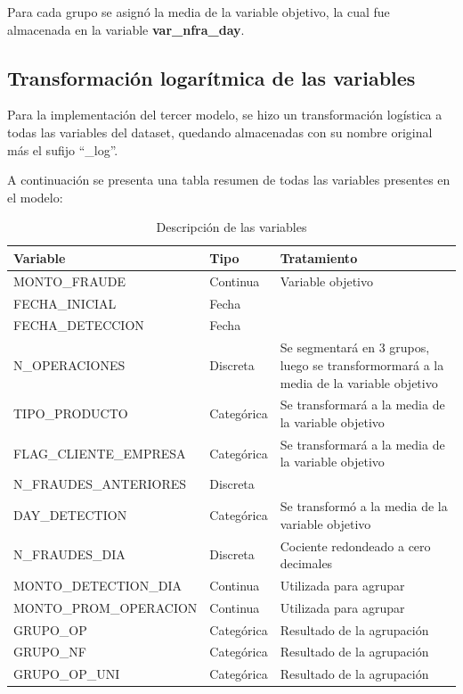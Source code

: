 \documentclass[
	11pt, %
	spanish, %
]{fphw}
\begin{document}
Para cada grupo se asignó la media de la variable objetivo, la cual fue almacenada en la variable \textbf{var\_nfra\_day}.

\subsection*{Transformación logarítmica de las variables}
Para la implementación del tercer modelo, se hizo un transformación logística a todas las variables del dataset, quedando almacenadas con su nombre original más el sufijo ``\_log''.

\bigskip
\bigskip
A continuación se presenta una tabla resumen de todas las variables presentes en el modelo:

\newpage
\begin{landscape}
\begin{table}[]
\centering
\small
\caption{Descripción de las variables}
\label{tab:my-table2}
\begin{tabular}{lll}
\hline
\textbf{Variable} & \textbf{Tipo} & \textbf{Tratamiento} \\ \hline
MONTO\_FRAUDE & Continua & Variable objetivo \\
FECHA\_INICIAL & Fecha &  \\
FECHA\_DETECCION & Fecha &  \\
N\_OPERACIONES & Discreta & Se segmentará en 3 grupos, luego se transformormará a la media de la variable objetivo \\
TIPO\_PRODUCTO & Categórica & Se transformará a la media de la variable objetivo \\
FLAG\_CLIENTE\_EMPRESA & Categórica & Se transformará a la media de la variable objetivo \\
N\_FRAUDES\_ANTERIORES & Discreta &  \\
DAY\_DETECTION & Categórica & Se transformó a la media de la variable objetivo \\
N\_FRAUDES\_DIA & Discreta & Cociente redondeado a cero decimales \\
MONTO\_DETECTION\_DIA & Continua & Utilizada para agrupar \\
MONTO\_PROM\_OPERACION & Continua & Utilizada para agrupar \\
GRUPO\_OP & Categórica & Resultado de la agrupación \\
GRUPO\_NF & Categórica & Resultado de la agrupación \\
GRUPO\_OP\_UNI & Categórica & Resultado de la agrupación \\

\end{tabular}
\end{table}
\end{landscape}
\end{document}
